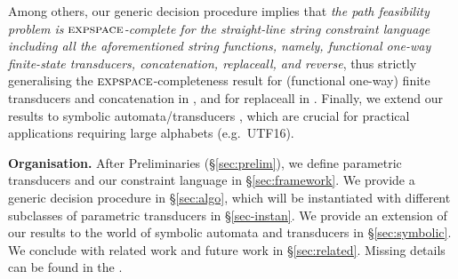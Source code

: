 Among others, our generic decision procedure implies that \emph{the path feasibility problem is $\textsc{expspace}$-complete for the straight-line string constraint language including all the aforementioned string functions, namely, functional one-way finite-state transducers, concatenation, replaceall, and reverse}, thus strictly generalising the $\textsc{expspace}$-completeness result for (functional one-way) finite transducers and concatenation in \cite{LB16}, and
for replaceall in \cite{CCHLW18}.
%
Finally, we extend our results to symbolic automata/transducers
\cite{BEK,symbolic-transducer,DV13,symbolic-transducer-power}, which are crucial for practical 
applications requiring large alphabets (e.g.~UTF16).

%

\smallskip
\noindent
\textbf{Organisation.}
After Preliminaries (\S \ref{sec:prelim}), we define parametric transducers
and our constraint language in \S \ref{sec:framework}. We provide a generic
decision procedure in \S \ref{sec:algo}, which will be instantiated with
different subclasses of parametric transducers in \S \ref{sec-instan}.
We provide an extension of our results to the world of symbolic
automata and transducers in \S \ref{sec:symbolic}. We conclude with 
related work and future work in \S \ref{sec:related}. Missing details can
be found in the .
